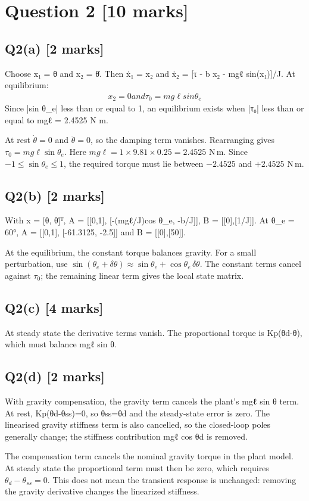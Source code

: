 \documentclass[11pt,a4paper]{article}
\begin{document}
\section*{Question 2 \hfill [10 marks]}
\subsection*{Q2(a) \hfill [2 marks]}

Choose x₁ = θ and x₂ = θ̇.
Then ẋ₁ = x₂ and ẋ₂ = [τ - b x₂ - mgℓ sin(x₁)]/J.
At equilibrium:\[\begin{aligned}x_2 = 0 and τ_0 = mg\ell sin \theta_e\end{aligned}\]
Since |sin θ\_e| less than or equal to 1, an equilibrium exists when |τ₀| less than or equal to mgℓ = 2.4525 N m.\par\smallskip At rest $\dot\theta=0$ and $\ddot\theta=0$, so the damping term vanishes. Rearranging gives $\tau_0=mg\ell\sin\theta_e$. Here $mg\ell=1\times9.81\times0.25=2.4525$ N\,m. Since $-1\leq\sin\theta_e\leq1$, the required torque must lie between $-2.4525$ and $+2.4525$ N\,m.

\subsection*{Q2(b) \hfill [2 marks]}

With x = [θ, θ̇]ᵀ, A = [[0,1], [-(mgℓ/J)cos θ\_e, -b/J]], B = [[0],[1/J]].
At θ\_e = 60°, A = [[0,1], [-61.3125, -2.5]] and B = [[0],[50]].\par\smallskip At the equilibrium, the constant torque balances gravity. For a small perturbation, use $\sin(\theta_e+\delta\theta)\approx\sin\theta_e+\cos\theta_e\,\delta\theta$. The constant terms cancel against $\tau_0$; the remaining linear term gives the local state matrix.

\subsection*{Q2(c) \hfill [4 marks]}

At steady state the derivative terms vanish.
The proportional torque is Kp(θd-θ), which must balance mgℓ sin θ.

\subsection*{Q2(d) \hfill [2 marks]}

With gravity compensation, the gravity term cancels the plant's mgℓ sin θ term.
At rest, Kp(θd-θss)=0, so θss=θd and the steady-state error is zero.
The linearised gravity stiffness term is also cancelled, so the closed-loop poles generally change; the stiffness contribution mgℓ cos θd is removed.\par\smallskip The compensation term cancels the nominal gravity torque in the plant model. At steady state the proportional term must then be zero, which requires $\theta_d-\theta_{ss}=0$. This does not mean the transient response is unchanged: removing the gravity derivative changes the linearized stiffness.
\end{document}
